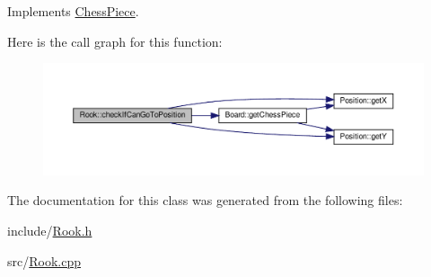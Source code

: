 Implements \hyperlink{classChessPiece_a90119a7c3c74ed9f967c398b8a7d7a98}{Chess\+Piece}.

Here is the call graph for this function\+:
\nopagebreak
\begin{figure}[H]
\begin{center}
\leavevmode
\includegraphics[width=350pt]{classRook_aad67c9012197bf285cf6a27861fbcb06_cgraph}
\end{center}
\end{figure}


The documentation for this class was generated from the following files\+:\begin{DoxyCompactItemize}
\item 
include/\hyperlink{Rook_8h}{Rook.\+h}\item 
src/\hyperlink{Rook_8cpp}{Rook.\+cpp}\end{DoxyCompactItemize}
